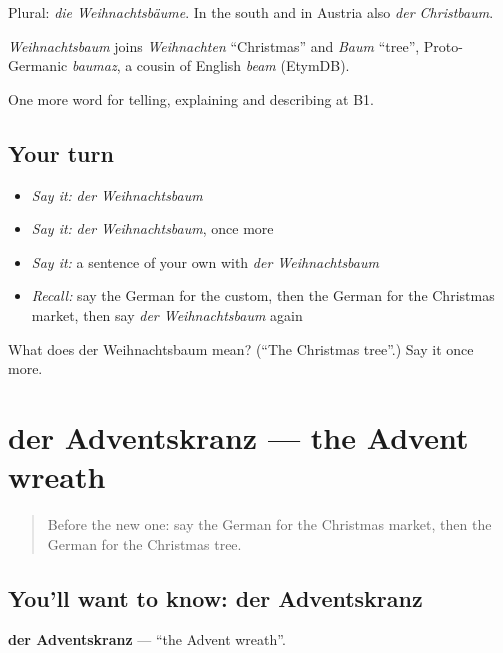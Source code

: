 Plural: \emph{die Weihnachtsbäume}. In the south and in Austria also \emph{der Christbaum}.

\begin{cousinweb}
\emph{Weihnachtsbaum} joins \emph{Weihnachten} \textquotedblleft{}Christmas\textquotedblright{} and \emph{Baum} \textquotedblleft{}tree\textquotedblright{}, Proto-Germanic \emph{baumaz}, a cousin of English \emph{beam} (EtymDB).
\end{cousinweb}

\begin{grammarlens}[title={What you've built}]
One more word for telling, explaining and describing at B1.
\end{grammarlens}

\subsection*{Your turn}
\begin{itemize}
\raggedright
  \item \emph{Say it:} \emph{der Weihnachtsbaum}
  \item \emph{Say it:} \emph{der Weihnachtsbaum}, once more
  \item \emph{Say it:} a sentence of your own with \emph{der Weihnachtsbaum}
  \item \emph{Recall:} say the German for the custom, then the German for the Christmas market, then say \emph{der Weihnachtsbaum} again
\end{itemize}

\begin{tcolorbox}[breakable,colback=teal!4,colframe=teal!35!black,title={Before you move on}]
What does der Weihnachtsbaum mean? (\textquotedblleft{}The Christmas tree\textquotedblright{}.) Say it once more.
\end{tcolorbox}
\section[der Adventskranz]{der Adventskranz — the Advent wreath}

\label{lesson:GE-C311-adventskranz}



\begin{quote}
Before the new one: say the German for the Christmas market, then the German for the Christmas tree.
\end{quote}

\subsection*{You'll want to know: der Adventskranz}
\textbf{der Adventskranz} — \textquotedblleft{}the Advent wreath\textquotedblright{}.


